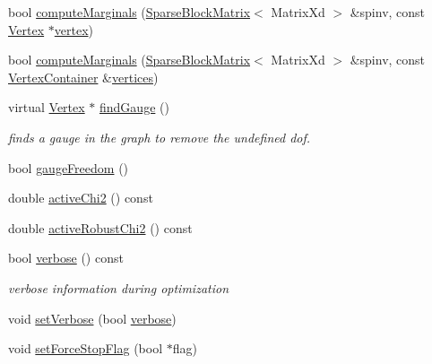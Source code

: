 \begin{DoxyCompactItemize}
\item 
bool \mbox{\hyperlink{classg2o_1_1_sparse_optimizer_ad9f7ba03f7f37114f757f34f67dd48e5}{compute\+Marginals}} (\mbox{\hyperlink{classg2o_1_1_sparse_block_matrix}{Sparse\+Block\+Matrix}}$<$ Matrix\+Xd $>$ \&spinv, const \mbox{\hyperlink{classg2o_1_1_hyper_graph_1_1_vertex}{Vertex}} $\ast$\mbox{\hyperlink{structg2o_1_1_optimizable_graph_a19e014e8ec2e9a6e894da8c3a8f8e50d}{vertex}})
\item 
bool \mbox{\hyperlink{classg2o_1_1_sparse_optimizer_a06bd3e9f1576dafeae317d2697c6f532}{compute\+Marginals}} (\mbox{\hyperlink{classg2o_1_1_sparse_block_matrix}{Sparse\+Block\+Matrix}}$<$ Matrix\+Xd $>$ \&spinv, const \mbox{\hyperlink{structg2o_1_1_optimizable_graph_a54f01b9b6071e65e6abeebe4afb29dec}{Vertex\+Container}} \&\mbox{\hyperlink{classg2o_1_1_hyper_graph_a95fcf7cd9d89562b2c26d99ede3548ed}{vertices}})
\item 
virtual \mbox{\hyperlink{classg2o_1_1_hyper_graph_1_1_vertex}{Vertex}} $\ast$ \mbox{\hyperlink{classg2o_1_1_sparse_optimizer_aad77b73bf7d192fcebf1daf9ae103036}{find\+Gauge}} ()
\begin{DoxyCompactList}\small\item\em finds a gauge in the graph to remove the undefined dof. \end{DoxyCompactList}\item 
bool \mbox{\hyperlink{classg2o_1_1_sparse_optimizer_ac99e785f4822dd540b389ea179ce4f06}{gauge\+Freedom}} ()
\item 
double \mbox{\hyperlink{classg2o_1_1_sparse_optimizer_ab64abc4e84ba0fd8f55dbd12477ef76d}{active\+Chi2}} () const
\item 
double \mbox{\hyperlink{classg2o_1_1_sparse_optimizer_a9a8950d87cbbfe991b5f6381db19593c}{active\+Robust\+Chi2}} () const
\item 
bool \mbox{\hyperlink{classg2o_1_1_sparse_optimizer_a8f0a83518efcba45f769b8b221885b54}{verbose}} () const
\begin{DoxyCompactList}\small\item\em verbose information during optimization \end{DoxyCompactList}\item 
void \mbox{\hyperlink{classg2o_1_1_sparse_optimizer_a422f4c5c78a0c475f4998e24ee173cc7}{set\+Verbose}} (bool \mbox{\hyperlink{classg2o_1_1_sparse_optimizer_a8f0a83518efcba45f769b8b221885b54}{verbose}})
\item 
void \mbox{\hyperlink{classg2o_1_1_sparse_optimizer_a32afd0ab949f170297b4a59f0d9eab81}{set\+Force\+Stop\+Flag}} (bool $\ast$flag)

\end{DoxyCompactItemize}
